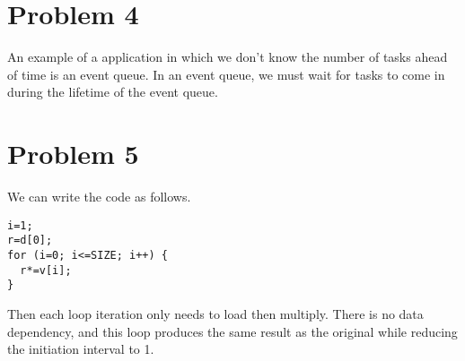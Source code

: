 \documentclass[12pt]{article}
\begin{document}
\section*{Problem 4}

An example of a application in which we don't know the number of tasks ahead of time is an event queue.
In an event queue, we must wait for tasks to come in during the lifetime of the event queue.

\section*{Problem 5}

We can write the code as follows.
\begin{verbatim}
i=1;
r=d[0];
for (i=0; i<=SIZE; i++) {
  r*=v[i];
}
\end{verbatim}
Then each loop iteration only needs to load then multiply. There is no data dependency, and this loop
produces the same result as the original while reducing the initiation interval to 1.
\end{document}
